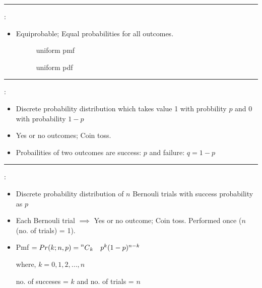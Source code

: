 \documentclass[	DIV=calc,%
paper=a4,%
fontsize=11pt,%
twocolumn]{scrartcl} %
\newcommand{\hformbar}[1]{\vspace{5pt}\hrule\vspace{10pt}} %
\newcommand{\formdesc}[1]{\noindent\textbf{#1}}
\begin{document}
\newpage
\hformbar

\formdesc{Uniform Distribution}:
\begin{itemize}
	\item Equiprobable; Equal probabilities for all outcomes.

	\begin{figure}[ht!]
		\centering
		\graphicspath{ {images/math/} }
		\caption{uniform pmf}
		
	\end{figure}


	\begin{figure}[ht!]
		\centering
		\graphicspath{ {images/math/} }
		\caption{uniform pdf}
		
	\end{figure}

\end{itemize}

\hformbar

\formdesc{Bernouli Distribution}:

\begin{itemize}
	\item Discrete probability distribution which takes value 1 with probbility $p$ and 0 with probability $1-p$
	\item Yes or no outcomes; Coin toss.
	\item Probailities of two outcomes are success: $p$ and failure: $q = 1-p$
\end{itemize}

\hformbar

\formdesc{Binomial Distribution}:
\newcommand\Mycomb[2][^n]{\prescript{#1\mkern-0.5mu}{}C_{#2}}
\begin{itemize}
	\item Discrete probability distribution of $n$ Bernouli trials with success probability as $p$
	\item Each Bernouli trial $\implies$ Yes or no outcome; Coin toss. Performed once ($n$ (no. of trials) = 1).

	\item Pmf \begin{math}
		 = Pr(k;n,p) = \Mycomb[n]{k}\quad  p^k (1-p)^{n-k}
	\end{math}
	
	where, $k = {0, 1, 2, ..., n}$ 
	
	no. of succeses = $k$ and no. of trials = $n$
	
\end{itemize}
\end{document}

